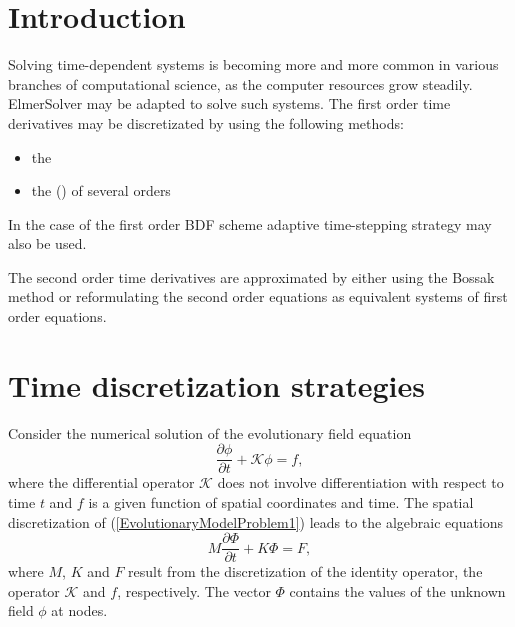 \newcommand{\ExampleOperator}{\mathcal{K}}

\noindent

\begin{versiona}

\section{Introduction}

Solving time-dependent systems is becoming more and more common 
in various branches of computational science,
as the computer resources grow steadily.
ElmerSolver may be adapted to solve such systems. The first order time 
derivatives may be discretizated by using the following methods:
\begin{itemize}
\item the 
\item the  () of several orders
\end{itemize}
In the case of the first order BDF scheme adaptive time-stepping strategy may also
be used. 

The second order time derivatives are approximated by either using the Bossak 
method or reformulating the second order equations as equivalent systems
of first order equations. 


\section{Time discretization strategies}

Consider the numerical solution of the evolutionary field equation 
\begin{equation}\label{EvolutionaryModelProblem1}
\frac{\partial \phi}{\partial t} %
+\ExampleOperator\phi = f,
\end{equation}
where the differential operator $\ExampleOperator$ does not involve 
differentiation with respect to time $t$ and $f$ is a given function of spatial 
coordinates and time. The spatial discretization of (\ref{EvolutionaryModelProblem1}) 
leads to the algebraic equations 
\begin{equation}\label{EqToTimeDiscretizate}
M\frac{\partial \Phi}{\partial t} + K\Phi = F,
\end{equation}
where $M$, $K$ and $F$ result from the discretization of the identity operator,
the operator $\ExampleOperator$ and $f$, respectively. 
The vector $\Phi$ contains the values of the unknown field $\phi$ at nodes.  


\end{versiona}
